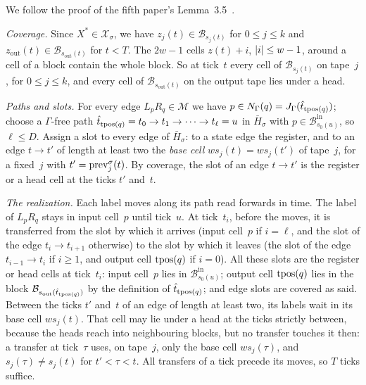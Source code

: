 \begin{outline}
We follow the proof of the fifth paper's Lemma~3.5~\cite{DirectedRecovery2026}.

\emph{Coverage.} Since $X^*\in\mathcal X_\sigma$, we have $z_j(t)\in\mathcal B_{s_j(t)}$ for $0\le j\le k$ and
$z_{\mathrm{out}}(t)\in\mathcal B_{s_{\mathrm{out}}(t)}$ for $t<T$. The $2w-1$ cells $z(t)+i$, $\lvert i \rvert\le w-1$, around a
cell of a block contain the whole block. So at tick~$t$ every cell of $\mathcal B_{s_j(t)}$ on tape~$j$, for
$0\le j\le k$, and every cell of $\mathcal B_{s_{\mathrm{out}}(t)}$ on the output tape lies under a head.

\emph{Paths and slots.} For every edge $L_pR_q\in\mathcal M$ we have $p\in N_\Gamma(q)=J_\Gamma(\hat t_{\operatorname{tpos}(q)})$;
choose a $\Gamma$-free path $\hat t_{\operatorname{tpos}(q)}=t_0\to t_1\to\dots\to t_\ell=u$ in $\bar H_\sigma$ with
$p\in\mathcal B^{\mathrm{in}}_{s_0(u)}$, so $\ell\le D$. Assign a slot to every edge of $\bar H_\sigma$: to a state edge
the register, and to an edge $t\to t'$ of length at least two the \emph{base cell} $ws_j(t)=ws_j(t')$ of tape~$j$, for
a fixed~$j$ with $t'=\mathrm{prev}^\sigma_j(t)$. By coverage, the slot of an edge $t\to t'$ is the register or a head cell at
the ticks $t'$ and~$t$.

\emph{The realization.} Each label moves along its path read forwards in time. The label of $L_pR_q$ stays in input
cell~$p$ until tick~$u$. At tick~$t_i$, before the moves, it is transferred from the slot by which it arrives (input
cell~$p$ if $i=\ell$, and the slot of the edge $t_i\to t_{i+1}$ otherwise) to the slot by which it leaves (the slot of the
edge $t_{i-1}\to t_i$ if $i\ge1$, and output cell $\operatorname{tpos}(q)$ if $i=0$). All these slots are the register or head cells
at tick~$t_i$: input cell~$p$ lies in $\mathcal B^{\mathrm{in}}_{s_0(u)}$; output cell $\operatorname{tpos}(q)$ lies in the block
$\mathcal B_{s_{\mathrm{out}}(\hat t_{\operatorname{tpos}(q)})}$ by the definition of $\hat t_{\operatorname{tpos}(q)}$; and edge slots are covered
as said. Between the ticks $t'$ and~$t$ of an edge of length at least two, its labels wait in its base cell $ws_j(t)$.
That cell may lie under a head at the ticks strictly between, because the heads reach into neighbouring blocks, but no
transfer touches it then: a transfer at tick~$\tau$ uses, on tape~$j$, only the base cell $ws_j(\tau)$, and
$s_j(\tau)\ne s_j(t)$ for $t'<\tau<t$. All transfers of a tick precede its moves, so $T$ ticks suffice.


\end{outline}
